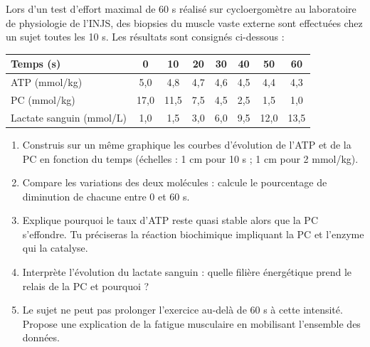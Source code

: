 \documentclass[11pt]{article}
\begin{document}
\begin{exercice}
Lors d'un test d'effort maximal de 60 s réalisé sur cycloergomètre au laboratoire de physiologie de l'INJS, des biopsies du muscle vaste externe sont effectuées chez un sujet toutes les 10 s. Les résultats sont consignés ci-dessous :
\begin{center}
\begin{tabular}{|l|c|c|c|c|c|c|c|}
\hline
\rowcolor{popblueL} Temps (s) & 0 & 10 & 20 & 30 & 40 & 50 & 60 \\
\hline ATP (mmol/kg) & 5,0 & 4,8 & 4,7 & 4,6 & 4,5 & 4,4 & 4,3 \\
\hline PC (mmol/kg) & 17,0 & 11,5 & 7,5 & 4,5 & 2,5 & 1,5 & 1,0 \\
\hline Lactate sanguin (mmol/L) & 1,0 & 1,5 & 3,0 & 6,0 & 9,5 & 12,0 & 13,5 \\
\hline
\end{tabular}
\end{center}
\begin{enumerate}
\item Construis sur un même graphique les courbes d'évolution de l'ATP et de la PC en fonction du temps (échelles : 1 cm pour 10 s ; 1 cm pour 2 mmol/kg).
\item Compare les variations des deux molécules : calcule le pourcentage de diminution de chacune entre 0 et 60 s.
\item Explique pourquoi le taux d'ATP reste quasi stable alors que la PC s'effondre. Tu préciseras la réaction biochimique impliquant la PC et l'enzyme qui la catalyse.
\item Interprète l'évolution du lactate sanguin : quelle filière énergétique prend le relais de la PC et pourquoi ?
\item Le sujet ne peut pas prolonger l'exercice au-delà de 60 s à cette intensité. Propose une explication de la fatigue musculaire en mobilisant l'ensemble des données.
\end{enumerate}
\end{exercice}
\end{document}
